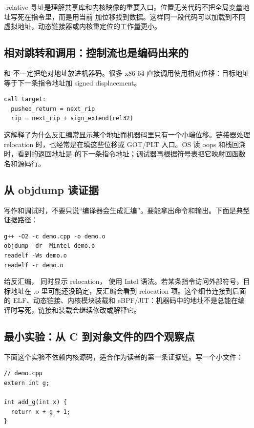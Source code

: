 -relative 寻址是理解共享库和内核映像的重要入口。位置无关代码不把全局变量地址写死在指令里，而是用当前  加位移找到数据。这样同一段代码可以加载到不同虚拟地址，动态链接器或内核重定位的工作量更小。

\subsection{相对跳转和调用：控制流也是编码出来的}

 和  不一定把绝对地址放进机器码。很多 x86-64 直接调用使用相对位移：目标地址等于下一条指令地址加 signed displacement。

\begin{lstlisting}
call target:
  pushed_return = next_rip
  rip = next_rip + sign_extend(rel32)
\end{lstlisting}

这解释了为什么反汇编常显示某个地址而机器码里只有一个小端位移。链接器处理 relocation 时，也经常是在填这些位移或 GOT/PLT 入口。OS 读 oops 和栈回溯时，看到的返回地址是  的下一条指令地址；调试器再根据符号表把它映射回函数名和源码行。

\subsection{从 objdump 读证据}

写作和调试时，不要只说“编译器会生成汇编”。要能拿出命令和输出。下面是典型证据路径：

\begin{lstlisting}
g++ -O2 -c demo.cpp -o demo.o
objdump -dr -Mintel demo.o
readelf -Ws demo.o
readelf -r demo.o
\end{lstlisting}

 给反汇编， 同时显示 relocation， 使用 Intel 语法。若某条指令访问外部符号，目标地址在 .o 里可能还没确定，反汇编会看到 relocation 项。这个细节连接到后面的 ELF、动态链接、内核模块装载和 eBPF/JIT：机器码中的地址不是总能在编译时写死，链接和装载会继续修改或解释它。

\subsection{最小实验：从 C 到对象文件的四个观察点}

下面这个实验不依赖内核源码，适合作为读者的第一条证据链。写一个小文件：

\begin{lstlisting}
// demo.cpp
extern int g;

int add_g(int x) {
  return x + g + 1;
}
\end{lstlisting}

